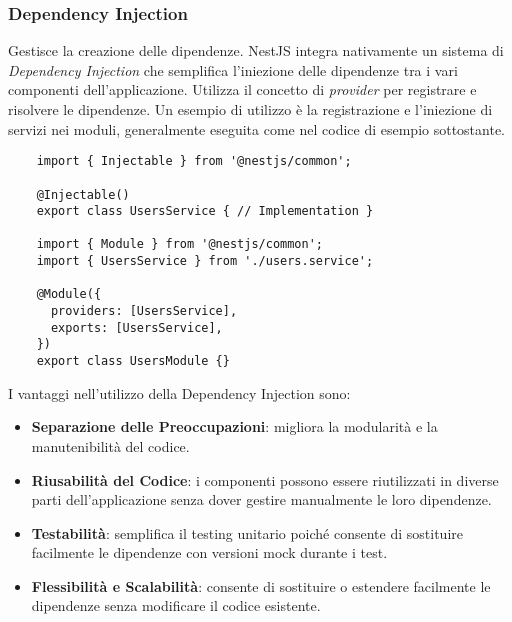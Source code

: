 \subsubsection{Dependency Injection}
Gestisce la creazione delle dipendenze. 
NestJS integra nativamente un sistema di \textit{Dependency Injection} che semplifica l'iniezione delle dipendenze tra i vari componenti dell'applicazione. 
Utilizza il concetto di \textit{provider} per registrare e risolvere le dipendenze.
Un esempio di utilizzo è la registrazione e l'iniezione di servizi nei moduli, generalmente eseguita come nel codice di esempio sottostante.
\begin{lstlisting}
	import { Injectable } from '@nestjs/common';

	@Injectable()
	export class UsersService { // Implementation }
	
	import { Module } from '@nestjs/common';
	import { UsersService } from './users.service';
	
	@Module({
	  providers: [UsersService],
	  exports: [UsersService],
	})
	export class UsersModule {}
\end{lstlisting}
I vantaggi nell'utilizzo della Dependency Injection sono:
\begin{itemize}
	\item \textbf{Separazione delle Preoccupazioni}: migliora la modularità e la manutenibilità del codice.
	\item \textbf{Riusabilità del Codice}: i componenti possono essere riutilizzati in diverse parti dell'applicazione senza dover gestire manualmente le loro dipendenze.
	\item \textbf{Testabilità}: semplifica il testing unitario poiché consente di sostituire facilmente le dipendenze con versioni mock durante i test.
	\item \textbf{Flessibilità e Scalabilità}: consente di sostituire o estendere facilmente le dipendenze senza modificare il codice esistente.
\end{itemize}


